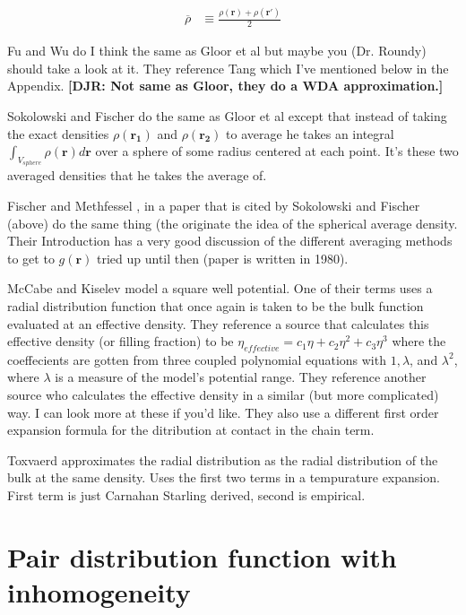 \documentclass[letterpaper,twocolumn,amsmath,amssymb,pre]{revtex4-1}
\newcommand{\red}[1]{{\bf \color{red} #1}}
\newcommand{\rr}{\textbf{r}}
\newcommand{\fixme}[1]{\red{[#1]}}
\begin{document}
\begin{align}
\overline{\rho} &\equiv \frac{\rho(\rr)+\rho(\rr')}{2}
\end{align}

Fu and Wu \cite{fu2005vapor} do I think the same as Gloor et al but
maybe you (Dr. Roundy) should take a look at it.  They reference Tang
\cite{tang2008accurate} which I've mentioned below in the Appendix.
\fixme{DJR: Not same as Gloor, they do a WDA approximation.}


Sokolowski and Fischer \cite{sokolowski1992role} do the same as Gloor
et al except that instead of taking the exact densities
$\rho(\mathbf{r_1})$ and $\rho(\mathbf{r_2})$ to average he takes an
integral $\int_{V_{sphere}} \rho(\mathbf{r})d\mathbf{r}$ over a sphere
of some radius centered at each point.  It's these two averaged
densities that he takes the average of.

Fischer and Methfessel \cite{fischer1980born}, in a paper that is
cited by Sokolowski and Fischer (above) do the same thing (the
originate the idea of the spherical average density.  Their
Introduction has a very good discussion of the different averaging
methods to get to $g(\mathbf{r})$ tried up until then (paper is
written in 1980).


McCabe and Kiselev \cite{mccabe2004application} model a square well
potential.  One of their terms uses a radial distribution function
that once again is taken to be the bulk function evaluated at an
effective density.  They reference a source that calculates this
effective density (or filling fraction) to be $\eta_{effective} =
c_1\eta + c_2\eta^2 + c_3\eta^3$ where the coeffecients are gotten
from three coupled polynomial equations with $1,\lambda$, and
$\lambda^2$, where $\lambda$ is a measure of the model's potential
range.  They reference another source who calculates the effective
density in a similar (but more complicated) way.  I can look more at
these if you'd like.  They also use a different first order expansion
formula for the ditribution at contact in the chain term.


Toxvaerd \cite{toxvaerd1976hydrostatic}approximates the radial
distribution as the radial distribution of the bulk at the same
density.  Uses the first two terms in a tempurature expansion.  First
term is just Carnahan Starling derived, second is empirical.


\section{Pair distribution function with inhomogeneity}
\end{document}
